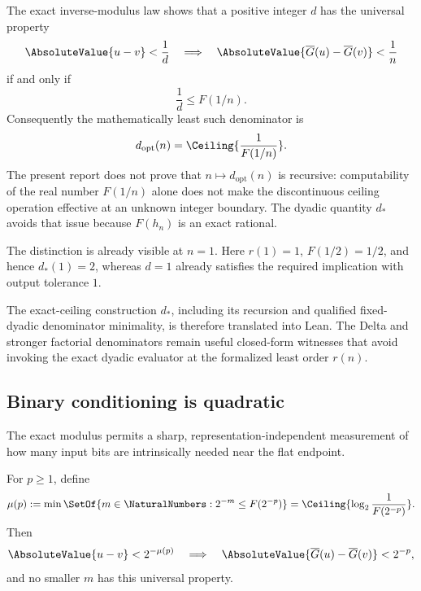 \begin{remark}
The exact inverse-modulus law shows that a positive integer $d$ has the
universal property
\[
 \AbsoluteValue{u-v}<\frac1d
 \quad\Longrightarrow\quad
 \AbsoluteValue{\InvT(u)-\InvT(v)}<\frac1n
\]
if and only if
\[
 \frac1d\le F(1/n).
\]
Consequently the mathematically least such denominator is
\[
 d_{\mathrm{opt}}(n)=\Ceiling{\frac1{F(1/n)}}.
\]
The present report does not prove that $n\mapsto d_{\mathrm{opt}}(n)$ is
recursive: computability of the real number $F(1/n)$ alone does not make the
discontinuous ceiling operation effective at an unknown integer boundary.
The dyadic quantity $d_*$ avoids that issue because $F(h_n)$ is an exact
rational.

The distinction is already visible at $n=1$.  Here $r(1)=1$,
$F(1/2)=1/2$, and hence $d_*(1)=2$, whereas $d=1$ already satisfies the
required implication with output tolerance $1$.
\end{remark}

The exact-ceiling construction $d_*$, including its recursion and qualified
fixed-dyadic denominator minimality, is therefore translated into Lean.  The
Delta and stronger factorial denominators remain useful closed-form witnesses
that avoid invoking the exact dyadic evaluator at the formalized least order
$r(n)$.

\subsection{Binary conditioning is quadratic}
\label{co:sec:binary-conditioning}

The exact modulus permits a sharp, representation-independent measurement of
how many input bits are intrinsically needed near the flat endpoint.

\begin{definition}\label{co:def:mu}
For $p\ge1$, define
\begin{equation}\label{co:eq:mu-def}
 \mu(p):=\min\SetOf{m\in\NaturalNumbers:2^{-m}\le F(2^{-p})}
 =\Ceiling{\log_2\frac1{F(2^{-p})}}.
\end{equation}
Then
\begin{equation}\label{co:eq:mu-property}
 \AbsoluteValue{u-v}<2^{-\mu(p)}
 \quad\Longrightarrow\quad
 \AbsoluteValue{\InvT(u)-\InvT(v)}<2^{-p},
\end{equation}
and no smaller $m$ has this universal property.
\end{definition}

